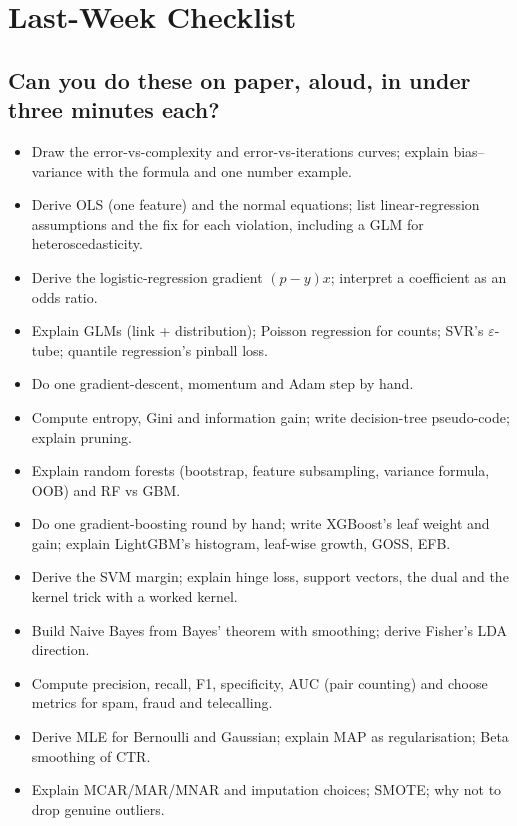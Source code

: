 \chapter*{Last-Week Checklist}

\section*{Can you do these on paper, aloud, in under three minutes each?}
\begin{itemize}
\item Draw the error-vs-complexity and error-vs-iterations curves; explain bias--variance with the formula and one number example.
\item Derive OLS (one feature) and the normal equations; list linear-regression assumptions and the fix for each violation, including a GLM for heteroscedasticity.
\item Derive the logistic-regression gradient $(p - y)x$; interpret a coefficient as an odds ratio.
\item Explain GLMs (link + distribution); Poisson regression for counts; SVR's $\varepsilon$-tube; quantile regression's pinball loss.
\item Do one gradient-descent, momentum and Adam step by hand.
\item Compute entropy, Gini and information gain; write decision-tree pseudo-code; explain pruning.
\item Explain random forests (bootstrap, feature subsampling, variance formula, OOB) and RF vs GBM.
\item Do one gradient-boosting round by hand; write XGBoost's leaf weight and gain; explain LightGBM's histogram, leaf-wise growth, GOSS, EFB.
\item Derive the SVM margin; explain hinge loss, support vectors, the dual and the kernel trick with a worked kernel.
\item Build Naive Bayes from Bayes' theorem with smoothing; derive Fisher's LDA direction.
\item Compute precision, recall, F1, specificity, AUC (pair counting) and choose metrics for spam, fraud and telecalling.
\item Derive MLE for Bernoulli and Gaussian; explain MAP as regularisation; Beta smoothing of CTR.
\item Explain MCAR/MAR/MNAR and imputation choices; SMOTE; why not to drop genuine outliers.

\end{itemize}
